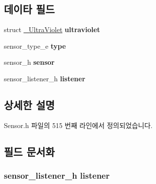 \subsection*{데이타 필드}
\begin{DoxyCompactItemize}
\item 
\hypertarget{struct___ultra_violet_extend_a5ecfbeb3a1030d60f8478b26f0ea7fb0}{struct \hyperlink{struct___ultra_violet}{\-\_\-\-Ultra\-Violet} {\bfseries ultraviolet}}\label{struct___ultra_violet_extend_a5ecfbeb3a1030d60f8478b26f0ea7fb0}

\item 
\hypertarget{struct___ultra_violet_extend_abffb09766da2fc510a79bb51f82a36e1}{sensor\-\_\-type\-\_\-e {\bfseries type}}\label{struct___ultra_violet_extend_abffb09766da2fc510a79bb51f82a36e1}

\item 
\hypertarget{struct___ultra_violet_extend_a5bae9b7801bc3808411925cde81d3f26}{sensor\-\_\-h {\bfseries sensor}}\label{struct___ultra_violet_extend_a5bae9b7801bc3808411925cde81d3f26}

\item 
\hypertarget{struct___ultra_violet_extend_aa977dfb866b24fd7d9a20a9a01b2fd1f}{sensor\-\_\-listener\-\_\-h {\bfseries listener}}\label{struct___ultra_violet_extend_aa977dfb866b24fd7d9a20a9a01b2fd1f}

\end{DoxyCompactItemize}


\subsection{상세한 설명}


Sensor.\-h 파일의 515 번째 라인에서 정의되었습니다.



\subsection{필드 문서화}
\hypertarget{struct___ultra_violet_extend_aa977dfb866b24fd7d9a20a9a01b2fd1f}{
\subsubsection[{listener}]{\setlength{\rightskip}{0pt plus 5cm}sensor\-\_\-listener\-\_\-h listener}}\label{struct___ultra_violet_extend_aa977dfb866b24fd7d9a20a9a01b2fd1f}


